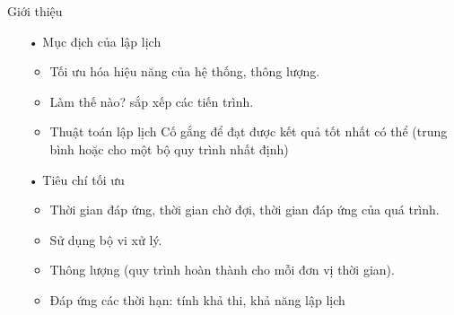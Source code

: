 \documentclass{beamer}
\begin{document}
\begin{frame}{Giới thiệu}
\begin{itemize}
\item[•] Mục địch của lập lịch
\begin{itemize}
\item Tối ưu hóa hiệu năng của hệ thống, thông lượng.
\item Làm thế nào? sắp xếp các tiến trình.
\item Thuật toán lập lịch Cố gắng để đạt được kết quả tốt nhất có thể (trung bình hoặc cho một bộ quy trình nhất định)
\end{itemize}
\item[•] Tiêu chí tối ưu
\begin{itemize}
\item Thời gian đáp ứng, thời gian chờ đợi, thời gian đáp ứng của quá trình.
\item Sử dụng bộ vi xử lý.
\item Thông lượng (quy trình hoàn thành cho mỗi đơn vị thời gian).
\item Đáp ứng các thời hạn: tính khả thi, khả năng lập lịch
\end{itemize}
\end{itemize}
\end{frame}
\end{document}
